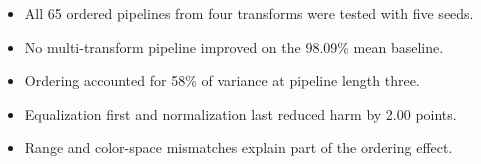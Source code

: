 
\begin{itemize}
    \item All 65 ordered pipelines from four transforms were tested with five seeds.
    \item No multi-transform pipeline improved on the 98.09\% mean baseline.
    \item Ordering accounted for 58\% of variance at pipeline length three.
    \item Equalization first and normalization last reduced harm by 2.00 points.
    \item Range and color-space mismatches explain part of the ordering effect.
\end{itemize}
